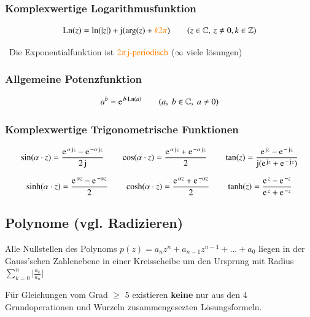 \subsubsection{Komplexwertige Logarithmusfunktion}

\textbf{}

\[ \mathop{} \! \mathrm{Ln}(z) = \ln(\vert z \vert) + \mathop{} \! \mathrm{j} (\arg(z)+ {\color{orange}k2\pi}) \qquad (z \in \mathbb{C}, \, z \neq 0, k \in \mathbb{Z})\]

\textrightarrow\ Die Exponentialfunktion ist ${\color{orange}2 \pi \mathop{} \! \mathrm{j}\text{-periodisch}}$ ($\infty$ viele lösungen)



\subsubsection{Allgemeine Potenzfunktion}

\textbf{}
\[a^b = \e^{b \cdot \Ln(a)} \qquad (a, \; b \in \mathbb{C}, \; a \neq 0)\]


\subsubsection{Komplexwertige Trigonometrische Funktionen}

\vspace{-0.2cm}

\[\sin(\alpha \cdot z) = \frac{\e^{\alpha \jimg z} - \e^{-\alpha \jimg z}}{2 \jimg} \qquad
    \cos(\alpha \cdot z) = \frac{\e^{\alpha \jimg z} + \e^{-\alpha \jimg z}}{2} \qquad
    \tan(z) = \frac{\e^{\jimg z} - \e^{-\jimg z}}{\jimg(\e^{\jimg z} + \e^{-\jimg z})}\]

\[\sinh(\alpha \cdot z) = \frac{\e^{\alpha z} - \e^{-\alpha z}}{2} \qquad
    \cosh(\alpha \cdot z) = \frac{\e^{\alpha z} + \e^{-\alpha z}}{2} \qquad
    \tanh(z) = \frac{\e^{z} - \e^{-z}}{\e^{z} + \e^{-z}}\]


\subsection{Polynome (vgl. Radizieren)}
Alle Nullstellen des Polynoms $p(z) = a_n z^n + a_{n-1}z^{n-1} + \ldots + a_0$ liegen in der Gauss'schen Zahlenebene in einer
Kreisscheibe um den Ursprung mit Radius $\sum\limits _{k=0}^n \bigl| \frac{a_k}{a_n} \bigl|$

\smallskip

Für Gleichungen vom Grad $\geq$ 5 existieren \textbf{keine} nur aus den 4 Grundoperationen und Wurzeln zusammengesezten Lösungsformeln.
